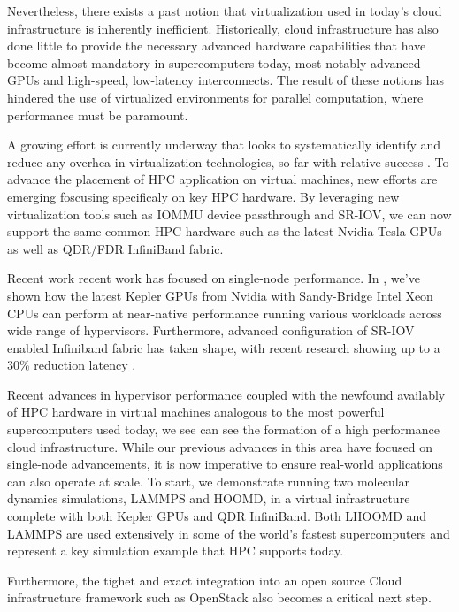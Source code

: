 Nevertheless, there exists a past notion that virtualization used in today's cloud infrastructure is inherently inefficient.  Historically, cloud infrastructure has also done little to provide the necessary advanced hardware capabilities that have become almost mandatory in supercomputers today, most notably advanced GPUs and high-speed, low-latency interconnects.  The result of these notions has hindered the use of virtualized environments for parallel computation, where performance must be paramount.

A growing effort is currently underway that looks to systematically identify and reduce any overhea in virtualization technologies, so far with relative success \cite{Younge2011cloud, Lukoviak}.  To advance the placement of HPC application on virtual machines, new efforts are emerging foscusing specificaly on key HPC hardware. By leveraging new virtualization tools such as IOMMU device passthrough and SR-IOV, we can now support the same common HPC hardware such as the latest Nvidia Tesla GPUs \cite{Younge2014}  as well as QDR/FDR InfiniBand fabric\cite{panda}.  

Recent work recent work has focused on single-node performance.  In \cite{walters2014}, we've shown how the latest Kepler GPUs from Nvidia  with Sandy-Bridge Intel Xeon CPUs can perform at near-native performance running various workloads across wide range of hypervisors. Furthermore, advanced configuration of SR-IOV enabled Infiniband fabric has taken shape, with recent research showing up to a 30\% reduction latency \cite{musleh2014}.  

Recent advances in hypervisor performance  \cite{Younge2011cloud} coupled with the newfound availably of HPC hardware in virtual machines analogous to the most powerful supercomputers used today, we see can see the formation of a high performance cloud infrastructure. While our previous advances in this area have focused on single-node advancements, it is now imperative to ensure real-world applications can also operate at scale. To start, we demonstrate running two molecular dynamics simulations, LAMMPS and HOOMD, in a virtual infrastructure complete with both Kepler GPUs and QDR InfiniBand.  Both LHOOMD and LAMMPS are used extensively in some of the world's fastest supercomputers and represent a key simulation example that HPC supports today.  

Furthermore, the tighet and exact integration into an open source Cloud infrastructure framework such as OpenStack also becomes a critical next step.  

